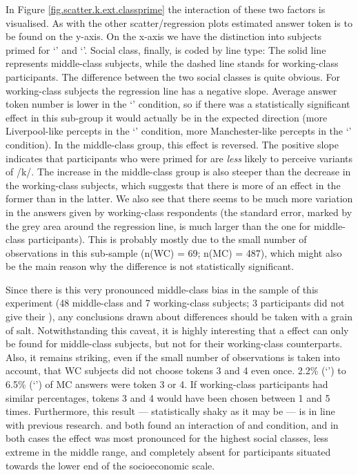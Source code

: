 In Figure \ref{fig.scatter.k.ext.classprime} the interaction of these two factors is visualised.
As with the other scatter/regression plots estimated answer token is to be found on the y-axis.
On the x-axis we have the distinction into subjects primed for `' and `'.
Social class, finally, is coded by line type: The solid line represents middle-class subjects, while the dashed line stands for working-class participants.
The difference between the two social classes is quite obvious.
For working-class subjects the regression line has a negative slope.
Average answer token number is lower in the `' condition, so if there was a statistically significant  effect in this sub-group it would actually be in the expected direction (more Liverpool-like percepts in the `' condition, more Manchester-like percepts in the `' condition).
In the middle-class group, this effect is reversed.
The positive slope indicates that participants who were primed for  are \emph{less} likely to perceive  variants of /k/.
The increase in the middle-class group is also steeper than the decrease in the working-class subjects, which suggests that there is more of an effect in the former than in the latter.
We also see that there seems to be much more variation in the answers given by working-class respondents (the standard error, marked by the grey area around the regression line, is much larger than the one for middle-class participants).
This is probably mostly due to the small number of observations in this sub-sample (n(WC) = 69; n(MC) = 487), which might also be the main reason why the difference is not statistically significant.

Since there is this very pronounced middle-class bias in the sample of this experiment (48 middle-class and 7 working-class subjects; 3 participants did not give their ), any conclusions drawn about  differences should be taken with a grain of salt.
Notwithstanding this caveat, it is highly interesting that a  effect can only be found for middle-class subjects, but not for their working-class counterparts.
Also, it remains striking, even if the small number of observations is taken into account, that WC subjects did not choose tokens 3 and 4 even once.
2.2\% (`') to 6.5\% (`') of MC answers were token 3 or 4.
If working-class participants had similar percentages, tokens 3 and 4 would have been chosen between 1 and 5 times.
Furthermore, this result --- statistically shaky as it may be --- is in line with previous research.
\textcite{hayetal2006a} and \textcite{haydrager2010} both found an interaction of  and condition, and in both cases the  effect was most pronounced for the highest social classes, less extreme in the middle range, and completely absent for participants situated towards the lower end of the socioeconomic scale.

